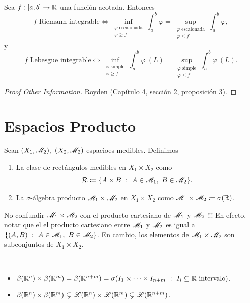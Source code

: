 \begin{prop}
	Sea $f : [a,b] \to \mathbb{R}$ una función acotada. Entonces
	\[ f \text{ Riemann integrable} \iff \inf_{\substack{\varphi \text{ escalonada} \\ \varphi \geq f}} \int_{a}^{b} \varphi = \sup_{\substack{\varphi \text{ escalonada} \\ \varphi \leq f}} \int_{a}^{b} \varphi, \]
	y
	\[ f \text{ Lebesgue integrable} \iff \inf_{\substack{\varphi \text{ simple} \\ \varphi \geq f}} \int_{a}^{b} \varphi \ (L) = \sup_{\substack{\varphi \text{ simple} \\ \varphi \leq f}} \int_{a}^{b} \varphi \ (L). \]
\end{prop}
\begin{proof}[Proof Other Information]
	Royden (Capítulo 4, sección 2, proposición 3).
\end{proof}

\chapter{Espacios Producto}

\begin{definition}
	Sean $(X_{1}, \mathscr{M}_{2}), \ (X_{2}, \mathscr{M}_{2})$ espacioes medibles. Definimos
	\begin{enumerate}
		\item La clase de rectángulos medibles en $X_{1} \times X_{2}$ como
		\[ \mathcal{R} \coloneq \{A \times B \ : \ A \in \mathscr{M}_{1},\ B \in \mathscr{M}_{2}\}. \]

		\item La $\sigma$-álgebra producto $\mathscr{M}_{1} \times \mathscr{M}_{2}$ en $X_{1} \times X_{2}$ como $\mathscr{M}_{1} \times \mathscr{M}_{2} \coloneq \sigma(\mathbb{R})$.
	\end{enumerate}
\end{definition}

\begin{note}
	No confundir $\mathscr{M}_{1} \times \mathscr{M}_{2}$ con el producto cartesiano de $\mathscr{M}_{1}$ y $\mathscr{M}_{2}$ !!! En efecto, notar que el el producto cartesiano entre $\mathscr{M}_{1}$ y $\mathscr{M}_{2}$ es igual a $\{(A, B) \ : \ A \in \mathscr{M}_{1},\ B \in \mathscr{M}_{2}\}$. En cambio, los elementos de $\mathscr{M}_{1} \times \mathscr{M}_{2}$ son subconjuntos de $X_{1} \times X_{2}$. 
\end{note}

\begin{eg}~
	\begin{itemize}
		\item $\beta(\mathbb{R}^n) \times \beta(\mathbb{R}^m) = \beta(\mathbb{R}^{n+m}) = \sigma(I_{1} \times \cdots \times I_{n+m} \ : \ I_{i} \subseteq \mathbb{R} \text{ intervalo})$.

		\item $\beta(\mathbb{R}^n) \times \beta(\mathbb{R}^m) \subsetneq \mathscr{L}(\mathbb{R}^n) \times \mathscr{L}(\mathbb{R}^m) \subsetneq \mathscr{L}(\mathbb{R}^{n+m})$.
	\end{itemize}
\end{eg}

